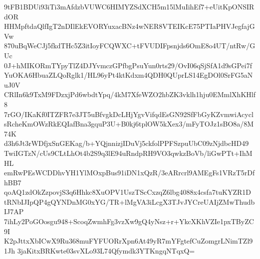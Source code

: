 9tFB1BDUi93iTi3mAfdzbVUWC6HIMYZSdXCH5m15lMuIihEf7+eUitKpONSIRdOR
HHMpftdaQlfIgT2nDIlEkEVORYuxacBNz4wNER8VTEIKcE75PTIaPHVJegfajGVw
870uBqWeCJj5fkdTHc5Z3itIoyFCQWXC+tFVUDIFpsnjds6OmE8o4UT/ntRw/GUc
0J+hMIKORmTYpyTlZ4DJYvmczGPfbgPsuYun0rts29/OvI06qSjSfA1d9sGPei7f
YuOKA6HbuaZLQoRglk1/HL96yPt4ktKdxm4QDH0QUprLS14EgDOl0SrFG5aNuJ0V
CRlIn6k9TxM9FDzxjPd6wbdtYpq/4kM7XfeWZO2hbZK3vklh1hju0EMmlXhKHlf8
7rGO/IKaKf0ITZFR7e3JT5uBfvgkDcLHjYgvVifqdEsGN92SfFbGyKZvmwiAcycl
sRcheKmOWzRkEQIafBna3gquP3U+B0kj6tplOW5kXex3/mFyTOJz1sBO8a/8M74K
d3h6Jt3rWDfjxSnGEKag/b+YQjnnizjIDuVj5ckfolPPFSzpuUbC09zNjdbcHD49
TwiIGTzN/cUs9CLtLhOt4b2S9q3lE94uRndpRH9VO3qwkzBoVb/liGwPTt+IhMHL
emRwPEsWCDDhvYH1YlMOxpBus91iDN1xQzR/3eARrcrl9AMEgFs1VRzT5rDfhBB7
qoAQ1zdOkZzpovjS3q6Hhkc8XuOPV1UszTScCxzqZ6lbg4088x4csfa7tuKYZR1D
tRNbIJIpQP4gQYNDnMG0xYG/TR+lMgVA3iLcgX3TJvJYCreUAIjZMwThudbIJ7AP
7ihLy2PoGOosgu948+ScoqZwmhFg3vzXw9gQ4yNsz+r+YkcXKhVZIe1pxTByZC9I
K2pJttxXbICwX9Ru368muFYFUORrXpn6At49yR7mYFgtefCuZomgrLNimTZl91Jh
3jaKitxBRKwte03svXLo93L74Qfymdk3YTKngqNTqxQ=
